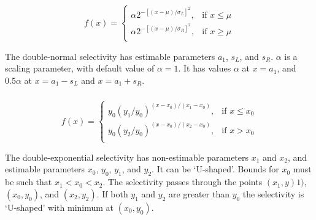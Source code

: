 \subsubsection[Double-normal]{}

\begin{equation}
  f(x) = \begin{cases}
    \alpha 2^{-[(x- \mu)/\sigma_L ]^2}, & \text{if $x \leq \mu$} \\
    \alpha 2^{-[(x- \mu)/\sigma_R ]^2}, & \text{if $x \ge \mu$}\\
  \end{cases}
\end{equation} 

The double-normal selectivity has estimable parameters $a_1$, $s_L$, and $s_R$. $\alpha$ is a scaling parameter, with default value of $\alpha = 1$. It has values $\alpha$ at $x=a_1$, and $0.5 \alpha$ at $x=a_1-s_L$ and $x=a_1+s_R$. 

\subsubsection[Double-exponential]{}

\begin{equation} 
f(x)=\begin{cases}
	  y_0(y_1 / y_0)^{(x-x_0)/(x_1-x_0)}, & \text{if $x \le x_0$} \\
	  y_0(y_2 / y_0)^{(x-x_0)/(x_2-x_0)}, & \text{if $x > x_0$} \\
  \end{cases}
\end{equation}

The double-exponential selectivity has non-estimable parameters $x_1$ and $x_2$, and estimable parameters $x_0$, $y_0$, $y_1$, and $y_2$. It can be `U-shaped'. Bounds for $x_0$ must be such that $x_1 < x_0 < x_2$. The selectivity passes through the points $(x_1, y)1)$, $(x_0, y_0)$, and $(x_2, y_2)$. If both $y_1$ and $y_2$ are greater than $y_0$ the selectivity is `U-shaped' with minimum at $(x_0, y_0)$.

